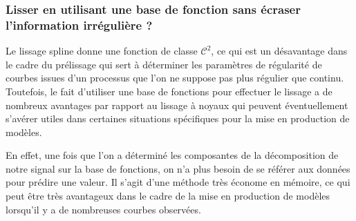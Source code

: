 \subsubsection{Lisser en utilisant une base de fonction sans écraser l'information irrégulière ?}

Le lissage spline donne une fonction de classe $\mathcal C^2$, ce qui est un désavantage dans le cadre du prélissage qui sert à déterminer les paramètres de régularité de courbes issues d'un processus que l'on ne suppose pas plus régulier que continu. Toutefois, le fait d'utiliser une base de fonctions pour effectuer le lissage a de nombreux avantages par rapport au lissage à noyaux qui peuvent éventuellement s'avérer utiles dans certaines situations spécifiques pour la mise en production de modèles.

En effet, une fois que l'on a déterminé les composantes de la décomposition de notre signal sur la base de fonctions, on n'a plus besoin de se référer aux données pour prédire une valeur. Il s'agit d'une méthode très économe en mémoire, ce qui peut être très avantageux dans le cadre de la mise en production de modèles lorsqu'il y a de nombreuses courbes observées.



